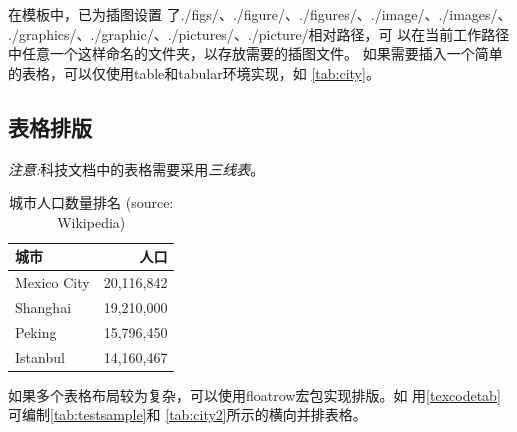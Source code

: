 \documentclass{sysucseexp}
\begin{document}
在模板中，已为插图设置
了{{./figs/}、{./figure/}、{./figures/}、{./image/}、{./images/}、
  {./graphics/}、{./graphic/}、{./pictures/}、{./picture/}}相对路径，可
以在当前工作路径中任意一个这样命名的文件夹，以存放需要的插图文件。
如果需要插入一个简单的表格，可以仅使用{table}和{tabular}环境实现，如%
\autoref{tab:city}。

\subsection{表格排版}
\emph{注意:}科技文档中的表格需要采用\emph{三线表}。
\begin{table}[!htb]
  \caption[城市人口]{城市人口数量排名 (source: Wikipedia)\label{tab:city}}
  \begin{tabular}{lr}
    \toprule
    城市 & 人口 \\
    \midrule
    Mexico City & 20,116,842\\
    Shanghai & 19,210,000\\
    Peking & 15,796,450\\
    Istanbul & 14,160,467\\
    \bottomrule
  \end{tabular}
\end{table}

如果多个表格布局较为复杂，可以使用floatrow宏包实现排版。如%
用\autoref{texcodetab}可编制\autoref{tab:testsample}和%
\autoref{tab:city2}所示的横向并排表格。%
\end{document}
